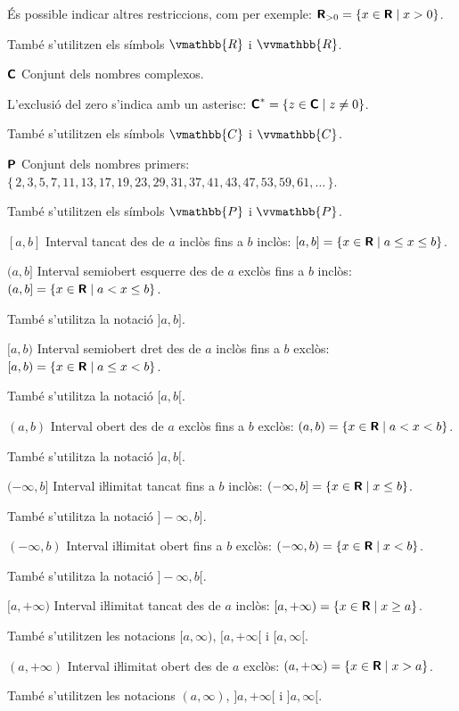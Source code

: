 \begin{list}{}
	 És possible indicar altres restriccions, com per exemple:  ${\boldsymbol{\mathsf{R}}}_{> 0} = \{ x \in {\ensuremath{\boldsymbol{\mathsf{R}}}} \mid x > 0 \}$. 
	 
	 També s'utilitzen els símbols $\vmathbb{R}$ i $\vvmathbb{R}$.
	 
	\item[${\boldsymbol{\mathsf{C}}}$] Conjunt dels nombres complexos.  
	
	L'exclusió del zero s'indica amb un asterisc: ${\boldsymbol{\mathsf{C}}}^* = \{ z \in {\ensuremath{\boldsymbol{\mathsf{C}}}} \mid z \ne 0 \}$.
	
	 També s'utilitzen els símbols $\vmathbb{C}$ i $\vvmathbb{C}$.
	 
	 \item[${\boldsymbol{\mathsf{P}}}$] Conjunt dels nombres primers: $\{\,2,3,5,7,11,13,17,19,23,29,31,37,41,43,47,53,59,61,\ldots\,\}$. 
	 
	 També s'utilitzen els símbols $\vmathbb{P}$ i $\vvmathbb{P}$.
	 
	 \item[{$[a,b]$}] Interval tancat des de $a$ inclòs fins a $b$ inclòs: $[a,b] = \{x \in {\ensuremath{\boldsymbol{\mathsf{R}}}} \mid a \leq x \leq b\}$.
	 
	 \item[{$(a,b]$}] Interval semiobert esquerre des de $a$ exclòs fins a $b$ inclòs: $(a,b] = \{x \in {\ensuremath{\boldsymbol{\mathsf{R}}}} \mid a < x \leq b\}$. 
	 
	 També s'utilitza la notació $]a,b]$.
	 
	 \item[{$[a,b)$}] Interval semiobert dret des de $a$ inclòs fins a $b$ exclòs: $[a,b) = \{x \in {\ensuremath{\boldsymbol{\mathsf{R}}}} \mid a \leq x < b\}$. 
	 
	 També s'utilitza la notació $[a,b[$.
	 
	 \item[{$(a,b)$}] Interval obert des de $a$ exclòs fins a $b$ exclòs: $(a,b) = \{x \in {\ensuremath{\boldsymbol{\mathsf{R}}}} \mid a < x < b\}$. 
	 
	 També s'utilitza la notació $]a,b[$.
	 
	 \item[{$(-\infty,b]$}] Interval iŀlimitat tancat fins a $b$ inclòs: $(-\infty,b] = \{x \in {\ensuremath{\boldsymbol{\mathsf{R}}}} \mid x \leq b\}$.  
	 
	 També s'utilitza la notació $]-\infty,b]$.
	 
	 \item[{$(-\infty,b)$}] Interval iŀlimitat obert fins a $b$ exclòs: $(-\infty,b) = \{x \in {\ensuremath{\boldsymbol{\mathsf{R}}}} \mid x < b\}$. 
	 
	 També s'utilitza la notació $]-\infty,b[$.
	 
	 \item[{$[a,+\infty)$}] Interval iŀlimitat tancat des de $a$ inclòs: $[a, +\infty) = \{x \in {\ensuremath{\boldsymbol{\mathsf{R}}}} \mid  x \geq a\}$. 
	 
	 També s'utilitzen les notacions $[a, \infty)$, $[a, +\infty[$ i $[a, \infty[$.

	\item[{$(a,+\infty)$}] Interval iŀlimitat obert des de $a$ exclòs: $(a, +\infty) = \{x \in {\ensuremath{\boldsymbol{\mathsf{R}}}} \mid  x > a\}$. 
	
	També s'utilitzen les notacions $(a, \infty)$, $]a, +\infty[$ i $]a, \infty[$.
\end{list}
